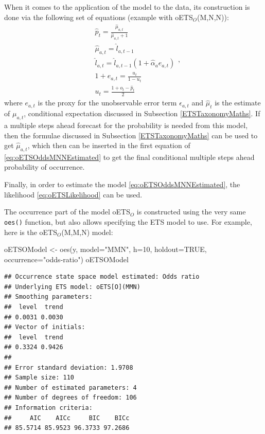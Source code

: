 \documentclass[
]{book}
\newenvironment{Shaded}{\begin{snugshade}}{\end{snugshade}}
\newcommand{\AttributeTok}[1]{\textcolor[rgb]{0.77,0.63,0.00}{#1}}
\newcommand{\ConstantTok}[1]{\textcolor[rgb]{0.00,0.00,0.00}{#1}}
\newcommand{\DecValTok}[1]{\textcolor[rgb]{0.00,0.00,0.81}{#1}}
\newcommand{\FunctionTok}[1]{\textcolor[rgb]{0.00,0.00,0.00}{#1}}
\newcommand{\NormalTok}[1]{#1}
\newcommand{\OtherTok}[1]{\textcolor[rgb]{0.56,0.35,0.01}{#1}}
\newcommand{\StringTok}[1]{\textcolor[rgb]{0.31,0.60,0.02}{#1}}
\theoremstyle{definition}
\theoremstyle{definition}
\theoremstyle{definition}
\theoremstyle{definition}
\theoremstyle{remark}
\begin{document}
When it comes to the application of the model to the data, its construction is done via the following set of equations (example with oETS\(_O\)(M,N,N)):
\begin{equation}
    \begin{aligned}
        & \hat{p}_t = \frac{\hat{\mu}_{a,t}}{\hat{\mu}_{a,t}+1} \\
        & \hat{\mu}_{a,t} = \hat{l}_{a,t-1} \\
        & \hat{l}_{a,t} = \hat{l}_{a,t-1}( 1  + \hat{\alpha}_{a} e_{a,t}) \\
        & 1+e_{a,t} = \frac{u_t}{1-u_t} \\
        & u_{t} = \frac{1 + o_t - \hat{p}_t}{2}
    \end{aligned},
    \label{eq:oETSOddsMNNEstimated}
\end{equation}
where \(e_{a,t}\) is the proxy for the unobservable error term \(\epsilon_{a,t}\) and \(\hat{\mu}_t\) is the estimate of \(\mu_{a,t}\), conditional expectation discussed in Subsection \ref{ETSTaxonomyMaths}. If a multiple steps ahead forecast for the probability is needed from this model, then the formulae discussed in Subsection \ref{ETSTaxonomyMaths} can be used to get \(\hat{\mu}_{a,t}\), which then can be inserted in the first equation of \eqref{eq:oETSOddsMNNEstimated} to get the final conditional multiple steps ahead probability of occurrence.

Finally, in order to estimate the model \eqref{eq:oETSOddsMNNEstimated}, the likelihood \eqref{eq:oETSLikelihood} can be used.

The occurrence part of the model oETS\(_O\) is constructed using the very same \texttt{oes()} function, but also allows specifying the ETS model to use. For example, here is the oETS\(_O\)(M,M,N) model:

\begin{Shaded}
\begin{Highlighting}[]
\NormalTok{oETSOModel }\OtherTok{\textless{}{-}} \FunctionTok{oes}\NormalTok{(y, }\AttributeTok{model=}\StringTok{"MMN"}\NormalTok{, }\AttributeTok{h=}\DecValTok{10}\NormalTok{, }\AttributeTok{holdout=}\ConstantTok{TRUE}\NormalTok{,}
                  \AttributeTok{occurrence=}\StringTok{"odds{-}ratio"}\NormalTok{)}
\NormalTok{oETSOModel}
\end{Highlighting}
\end{Shaded}

\begin{verbatim}
## Occurrence state space model estimated: Odds ratio
## Underlying ETS model: oETS[O](MMN)
## Smoothing parameters:
##  level  trend 
## 0.0031 0.0030 
## Vector of initials:
##  level  trend 
## 0.3324 0.9426 
## 
## Error standard deviation: 1.9708
## Sample size: 110
## Number of estimated parameters: 4
## Number of degrees of freedom: 106
## Information criteria: 
##     AIC    AICc     BIC    BICc 
## 85.5714 85.9523 96.3733 97.2686
\end{verbatim}
\end{document}
